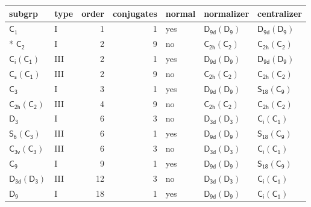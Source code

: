 \documentclass[10pt,a4paper]{article}
\numberwithin{equation}{section}
\newcommand{\grp}[1]{\mathsf{#1}}
\begin{document}
{\small\begin{longtable}{@{}llrrlll@{}}\toprule
subgrp & type & order & conjugates & normal & normalizer & centralizer\\\midrule\endhead
\bottomrule\endfoot\endlastfoot
\href{../../../rotation/data/pdf/C1.pdf}{$\grp{C_{1}}$} & I & 1 & 1 & yes & \href{D9d-D9.pdf}{$\grp{D_{9d}}(\grp{D_{9}})$} & \href{D9d-D9.pdf}{$\grp{D_{9d}}(\grp{D_{9}})$}\\*
\href{../../../rotation/data/pdf/C2.pdf}{$\grp{C_{2}}$} & I & 2 & 9 & no & \href{C2h-C2.pdf}{$\grp{C_{2h}}(\grp{C_{2}})$} & \href{C2h-C2.pdf}{$\grp{C_{2h}}(\grp{C_{2}})$}\\
\href{S2-C1.pdf}{$\grp{C_{i}}(\grp{C_{1}})$} & III & 2 & 1 & yes & \href{D9d-D9.pdf}{$\grp{D_{9d}}(\grp{D_{9}})$} & \href{D9d-D9.pdf}{$\grp{D_{9d}}(\grp{D_{9}})$}\\
\href{C1v-C1.pdf}{$\grp{C_{s}}(\grp{C_{1}})$} & III & 2 & 9 & no & \href{C2h-C2.pdf}{$\grp{C_{2h}}(\grp{C_{2}})$} & \href{C2h-C2.pdf}{$\grp{C_{2h}}(\grp{C_{2}})$}\\
\href{../../../rotation/data/pdf/C3.pdf}{$\grp{C_{3}}$} & I & 3 & 1 & yes & \href{D9d-D9.pdf}{$\grp{D_{9d}}(\grp{D_{9}})$} & \href{S18-C9.pdf}{$\grp{S_{18}}(\grp{C_{9}})$}\\
\href{C2h-C2.pdf}{$\grp{C_{2h}}(\grp{C_{2}})$} & III & 4 & 9 & no & \href{C2h-C2.pdf}{$\grp{C_{2h}}(\grp{C_{2}})$} & \href{C2h-C2.pdf}{$\grp{C_{2h}}(\grp{C_{2}})$}\\
\href{../../../rotation/data/pdf/D3.pdf}{$\grp{D_{3}}$} & I & 6 & 3 & no & \href{D3d-D3.pdf}{$\grp{D_{3d}}(\grp{D_{3}})$} & \href{S2-C1.pdf}{$\grp{C_{i}}(\grp{C_{1}})$}\\
\href{S6-C3.pdf}{$\grp{S_{6}}(\grp{C_{3}})$} & III & 6 & 1 & yes & \href{D9d-D9.pdf}{$\grp{D_{9d}}(\grp{D_{9}})$} & \href{S18-C9.pdf}{$\grp{S_{18}}(\grp{C_{9}})$}\\
\href{C3v-C3.pdf}{$\grp{C_{3v}}(\grp{C_{3}})$} & III & 6 & 3 & no & \href{D3d-D3.pdf}{$\grp{D_{3d}}(\grp{D_{3}})$} & \href{S2-C1.pdf}{$\grp{C_{i}}(\grp{C_{1}})$}\\
\href{../../../rotation/data/pdf/C9.pdf}{$\grp{C_{9}}$} & I & 9 & 1 & yes & \href{D9d-D9.pdf}{$\grp{D_{9d}}(\grp{D_{9}})$} & \href{S18-C9.pdf}{$\grp{S_{18}}(\grp{C_{9}})$}\\
\href{D3d-D3.pdf}{$\grp{D_{3d}}(\grp{D_{3}})$} & III & 12 & 3 & no & \href{D3d-D3.pdf}{$\grp{D_{3d}}(\grp{D_{3}})$} & \href{S2-C1.pdf}{$\grp{C_{i}}(\grp{C_{1}})$}\\
\href{../../../rotation/data/pdf/D9.pdf}{$\grp{D_{9}}$} & I & 18 & 1 & yes & \href{D9d-D9.pdf}{$\grp{D_{9d}}(\grp{D_{9}})$} & \href{S2-C1.pdf}{$\grp{C_{i}}(\grp{C_{1}})$}\\

\end{longtable}}
\end{document}

